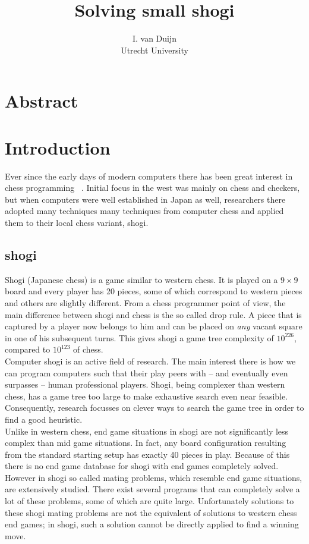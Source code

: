 \documentclass{article}
\title{Solving small shogi}
\author{I. van Duijn \\ Utrecht University}
\begin{document}
\maketitle

\section{Abstract}

\section{Introduction}
Ever since the early days of modern computers there has been great interest in chess programming ~\cite{shannon1950xxii}. Initial
focus in the west was mainly on chess and checkers, but when computers were well established in Japan as well, researchers there adopted
many techniques many techniques from computer chess and applied them to their local chess variant, shogi.

\subsection{shogi}%
Shogi (Japanese chess) is a game similar to western chess. It is played on a $9 \times 9$ board and every
player has 20 pieces, some of which correspond to western pieces and others are slightly different.
From a chess programmer point of view, the main difference between shogi and chess is the so called drop rule.
A piece that is captured by a player now belongs to him and can be placed on \textit{any} vacant square in one of his subsequent turns.
This gives shogi a game tree complexity of $10^{226}$, compared to $10^{123}$ of chess.\\

Computer shogi is an active field of research. The main interest there is how we can program computers 
such that their play peers with -- and eventually even surpasses -- human professional players. Shogi, being complexer
than western chess, has a game tree too large to make exhaustive search even near feasible. Consequently, research
focusses on clever ways to search the game tree in order to find a good heuristic.\\

Unlike in western chess, end game situations
in shogi are not significantly less complex than mid game situations. In fact, any board configuration resulting from the standard
starting setup has exactly 40 pieces in play. Because of this there is no end game database for shogi with end games completely
solved. However in shogi so called mating problems, which resemble end game situations, are extensively studied. There exist several
programs that can completely solve a lot of these problems, some of which are quite large. Unfortunately solutions to these shogi mating problems
are not the equivalent of solutions to western chess end games; in shogi, such a solution cannot be directly applied to find a winning move.
\end{document}

